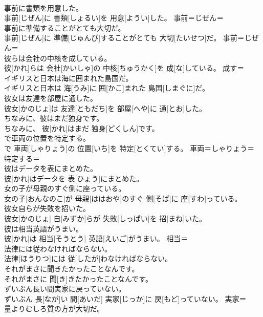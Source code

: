 \documentclass[8pt]{extreport}
\begin{document}
\begin{CJK}{UTF8}{min}
\\	事前に書類を用意した。	
\\	事前[じぜん]に 書類[しょるい]を 用意[ようい]した。	事前＝じぜん＝ 
\\	事前に準備することがとても大切だ。	
\\	事前[じぜん]に 準備[じゅんび]することがとても 大切[たいせつ]だ。	事前＝じぜん＝ 
\\	彼らは会社の中核を成している。	
\\	彼[かれ]らは 会社[かいしゃ]の 中核[ちゅうかく]を 成[な]している。	成す＝ 
\\	イギリスと日本は海に囲まれた島国だ。	
\\	イギリスと日本は 海[うみ]に 囲[かこ]まれた 島国[しまぐに]だ。	
\\	彼女は友達を部屋に通した。	
\\	彼女[かのじょ]は 友達[ともだち]を 部屋[へや]に 通[とお]した。	
\\	ちなみに、彼はまだ独身です。	
\\	ちなみに、 彼[かれ]はまだ 独身[どくしん]です。	
\\	で車両の位置を特定する。	
\\	で 車両[しゃりょう]の 位置[いち]を 特定[とくてい]する。	車両＝しゃりょう＝ 
\\	特定する＝ 
\\	彼はデータを表にまとめた。	
\\	彼[かれ]はデータを 表[ひょう]にまとめた。	
\\	女の子が母親のすぐ側に座っている。	
\\	女の子[おんなのこ]が 母親[ははおや]のすぐ 側[そば]に 座[すわ]っている。	
\\	彼女自らが失敗を招いた。	
\\	彼女[かのじょ] 自[みずか]らが 失敗[しっぱい]を 招[まね]いた。	
\\	彼は相当英語がうまい。	
\\	彼[かれ]は 相当[そうとう] 英語[えいご]がうまい。	相当＝ 
\\	法律には従わなければならない。	
\\	法律[ほうりつ]には 従[したが]わなければならない。	
\\	それがまさに聞きたかったことなんです。	
\\	それがまさに 聞[き]きたかったことなんです。	
\\	ずいぶん長い間実家に戻っていない。	
\\	ずいぶん 長[なが]い 間[あいだ] 実家[じっか]に 戻[もど]っていない。	実家＝ 
\\	量よりむしろ質の方が大切だ。	

\end{CJK}
\end{document}
